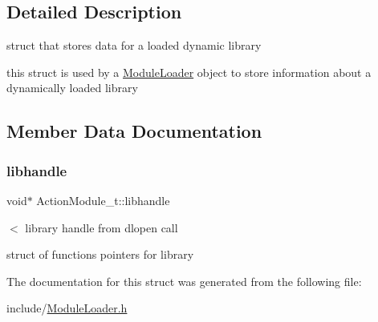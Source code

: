 \subsection{Detailed Description}
struct that stores data for a loaded dynamic library 

this struct is used by a \hyperlink{classModuleLoader}{Module\+Loader} object to store information about a dynamically loaded library 

\subsection{Member Data Documentation}
\mbox{\label{structActionModule__t_a94e6e256f50f4348101c7a9fb442b4b7}} 
\subsubsection{\texorpdfstring{libhandle}{libhandle}}
{\footnotesize\ttfamily void$\ast$ Action\+Module\+\_\+t\+::libhandle}



$<$ library handle from dlopen call 

struct of functions pointers for library 

The documentation for this struct was generated from the following file\+:\begin{DoxyCompactItemize}
\item 
include/\hyperlink{ModuleLoader_8h}{Module\+Loader.\+h}\end{DoxyCompactItemize}
